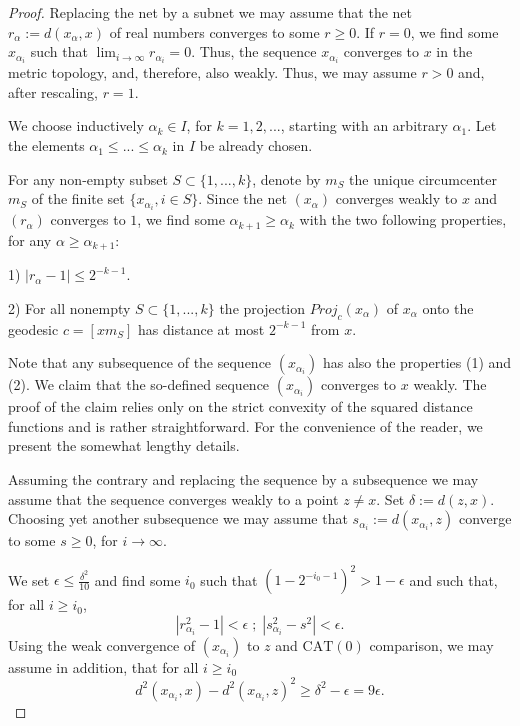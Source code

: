 \documentclass[12pt,leqno]{amsart}
\numberwithin{equation}{section}
\theoremstyle{remark}
\newcommand{\CAT}{\mathrm{CAT}}
\begin{document}
\begin{proof}
	Replacing the net by a subnet we may assume that the net $r_{\alpha}\mathrel{:=}d(x_{\alpha},x)$ 
	of real numbers converges to some $r\geq 0$. If $r=0$, we find some $x_{\alpha _i}$ such that $\lim _{i\to \infty} r_{\alpha_i} =0$. Thus, the sequence $x_{\alpha _i}$ converges to $x$ in the metric topology, and, therefore, also weakly. 
Thus, we may assume $r>0$ and, after rescaling, $r=1$. 

We choose inductively $\alpha _k \in I$, for $k=1,2,...$, starting with an arbitrary $\alpha _1$. Let the elements $\alpha _1\leq ...\leq \alpha _k$ in $I$ be already chosen.	 

For any non-empty subset $S \subset \{1,...,k\}$, denote by $m_S$ the unique circumcenter $m_S$ of the finite set $\{x_{\alpha _i}, i\in S\}$.
Since the net $(x_{\alpha})$ converges weakly to $x$ and $(r_{\alpha})$ converges to $1$, we find some $\alpha _{k+1} \geq \alpha _k$ with the two following properties, for any $\alpha \geq \alpha _{k+1}$: 

1) $|r_{\alpha} -1| \leq 2^{-k-1}$.

2) For all nonempty $S\subset \{1,...,k\}$ the projection $Proj _c (x_{\alpha})$ of $x_{\alpha}$ onto the geodesic
$c=[xm_S]$ has distance at most $2^{-k-1}$ from $x$.

Note that any subsequence of the sequence $(x_{\alpha_i})$ has also the properties (1) and (2). 
We claim that the so-defined sequence $(x_{\alpha _i})$ converges to $x$ weakly. 
The proof of the claim relies only on the strict convexity of the squared distance functions
and is rather straightforward.
For the convenience of the reader, we present the somewhat lengthy details. 

Assuming the contrary and replacing the sequence by a subsequence we may assume that the sequence converges weakly to a point $z\neq x$.
Set $\delta\mathrel{:=} d(z,x)$.
Choosing yet another subsequence we may assume that $s_{\alpha_i}\mathrel{:=} d(x_{\alpha_i} , z)$ converge to some $s \geq 0$, for $i\to \infty$. 

We set $\epsilon \leq \frac {\delta ^2} {10}$ and find some $i_0$ such that 
$(1- 2^{-i_0-1})^2 > 1 -\epsilon$ and such that, for all $i \geq i_0$,
$$|r_{\alpha_i} ^2 -1| <\epsilon \; ; \; |s_{\alpha_i} ^2-s^2| <\epsilon . $$
Using the weak convergence of $(x_{\alpha_i})$ to $z$ and $\CAT(0)$ comparison, we may assume in addition, that for all $i\geq i_0$ 
$$d^2(x_{\alpha _i}, x) -d^2(x_{\alpha_i} ,z) ^2 \geq	\delta ^2 -\epsilon = 9 \epsilon .$$


\end{proof}
\end{document}
